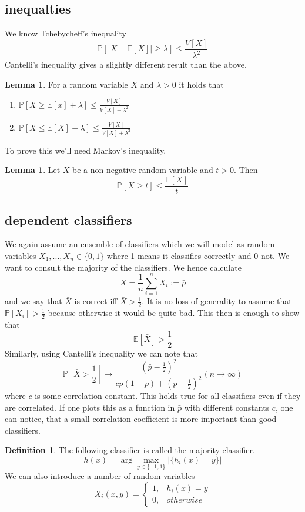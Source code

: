 \documentclass[a4paper, 12pt]{article}
\theoremstyle{plain}
\theoremstyle{definition}
\newtheorem{definition}[theorem]{Definition} %
\theoremstyle{lemma}
\newtheorem{lemma}[theorem]{Lemma}
\theoremstyle{remark}
\theoremstyle{example}
\begin{document}
	\subsection{inequalties}
	We know Tchebycheff's inequality \[\mathbb{P}[\left|X-\mathbb{E}[X]\right| \geq \lambda] \leq \frac{V[X]}{\lambda^2}\]
	Cantelli's inequality gives a slightly different result than the above. \begin{lemma}
		For a random variable $X$ and $\lambda >0$ it holds that \begin{enumerate}
			\item $\mathbb{P}[X\geq \mathbb{E}[x]+\lambda] \leq \frac{V[X]}{V[X]+\lambda^2}$
			\item $\mathbb{P}[X\leq \mathbb{E}[X]-\lambda] \leq \frac{V[X]}{V[X]+\lambda^2}$
		\end{enumerate} 
	\end{lemma}
	To prove this we'll need Markov's inequality. \begin{lemma}
		Let $X$ be a non-negative random variable and $t>0$. Then \[\mathbb{P}[X\geq t] \leq \frac{\mathbb{E}[X]}{t}\]
	\end{lemma}
	\subsection{dependent classifiers}
	We again assume an ensemble of classifiers which we will model as random variables $X_1,...,X_n \in \{0,1\}$ where 1 means it classifies correctly and 0 not. We want to consult the majority of the classifiers. We hence calculate \[\bar{X} = \frac{1}{n}\sum_{i=1}^n X_i := \bar{p}\] and we say that $\bar{X}$ is correct iff $\bar{X}>\frac{1}{2}$. It is no loss of generality to assume that $\mathbb{P}[X_i] > \frac{1}{2}$ because otherwise it would be quite bad. This then is enough to show that \[\mathbb{E}[\bar{X}] > \frac{1}{2}\] Similarly, using Cantelli's inequality we can note that \[\mathbb{P}[\bar{X}>\frac{1}{2}] \to \frac{(\bar{p}-\frac{1}{2})^2}{c\bar{p}(1-\bar{p}) + (\bar{p}-\frac{1}{2})^2} (n\to \infty)\] where $c$ is some correlation-constant. This holds true for all classifiers even if they are correlated. If one plots this as a function in $\bar{p}$ with different constants $c$, one can notice, that a small correlation coefficient is more important than good classifiers.
	\begin{definition}
		The following classifier is called the majority classifier.
		\[h(x) = \arg\max_{y\in \{-1,1\}} \left|\{h_i(x)=y\}\right|\]
		We can also introduce a number of random variables \[X_i(x,y) = \begin{cases}
			1, & h_i(x)=y\\
			0, & otherwise
		\end{cases}\]
	\end{definition}
\end{document}
